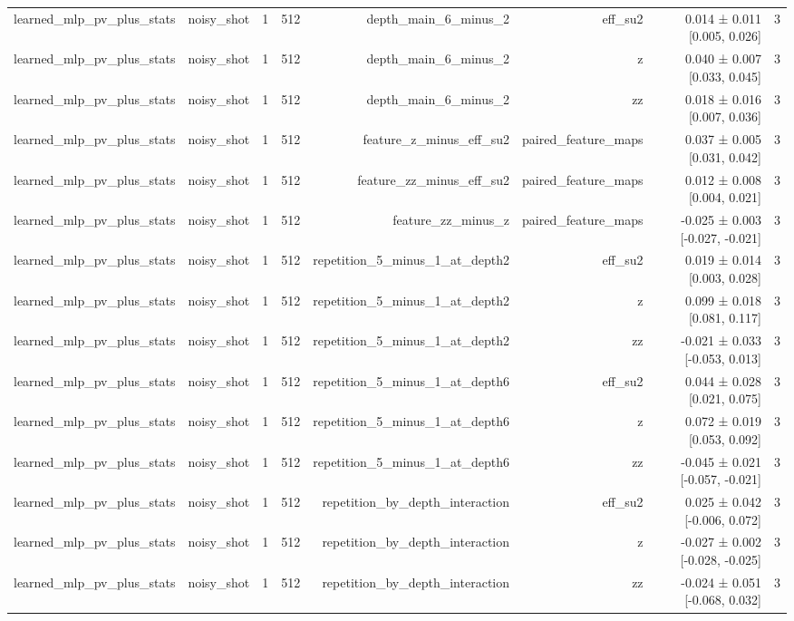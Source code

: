 \begin{table}
\begin{tabular}{lrrrrrrr}
learned\_mlp\_pv\_plus\_stats & noisy\_shot & 1 & 512 & depth\_main\_6\_minus\_2 & eff\_su2 & 0.014 ± 0.011 [0.005, 0.026] & 3 \\
learned\_mlp\_pv\_plus\_stats & noisy\_shot & 1 & 512 & depth\_main\_6\_minus\_2 & z & 0.040 ± 0.007 [0.033, 0.045] & 3 \\
learned\_mlp\_pv\_plus\_stats & noisy\_shot & 1 & 512 & depth\_main\_6\_minus\_2 & zz & 0.018 ± 0.016 [0.007, 0.036] & 3 \\
learned\_mlp\_pv\_plus\_stats & noisy\_shot & 1 & 512 & feature\_z\_minus\_eff\_su2 & paired\_feature\_maps & 0.037 ± 0.005 [0.031, 0.042] & 3 \\
learned\_mlp\_pv\_plus\_stats & noisy\_shot & 1 & 512 & feature\_zz\_minus\_eff\_su2 & paired\_feature\_maps & 0.012 ± 0.008 [0.004, 0.021] & 3 \\
learned\_mlp\_pv\_plus\_stats & noisy\_shot & 1 & 512 & feature\_zz\_minus\_z & paired\_feature\_maps & -0.025 ± 0.003 [-0.027, -0.021] & 3 \\
learned\_mlp\_pv\_plus\_stats & noisy\_shot & 1 & 512 & repetition\_5\_minus\_1\_at\_depth2 & eff\_su2 & 0.019 ± 0.014 [0.003, 0.028] & 3 \\
learned\_mlp\_pv\_plus\_stats & noisy\_shot & 1 & 512 & repetition\_5\_minus\_1\_at\_depth2 & z & 0.099 ± 0.018 [0.081, 0.117] & 3 \\
learned\_mlp\_pv\_plus\_stats & noisy\_shot & 1 & 512 & repetition\_5\_minus\_1\_at\_depth2 & zz & -0.021 ± 0.033 [-0.053, 0.013] & 3 \\
learned\_mlp\_pv\_plus\_stats & noisy\_shot & 1 & 512 & repetition\_5\_minus\_1\_at\_depth6 & eff\_su2 & 0.044 ± 0.028 [0.021, 0.075] & 3 \\
learned\_mlp\_pv\_plus\_stats & noisy\_shot & 1 & 512 & repetition\_5\_minus\_1\_at\_depth6 & z & 0.072 ± 0.019 [0.053, 0.092] & 3 \\
learned\_mlp\_pv\_plus\_stats & noisy\_shot & 1 & 512 & repetition\_5\_minus\_1\_at\_depth6 & zz & -0.045 ± 0.021 [-0.057, -0.021] & 3 \\
learned\_mlp\_pv\_plus\_stats & noisy\_shot & 1 & 512 & repetition\_by\_depth\_interaction & eff\_su2 & 0.025 ± 0.042 [-0.006, 0.072] & 3 \\
learned\_mlp\_pv\_plus\_stats & noisy\_shot & 1 & 512 & repetition\_by\_depth\_interaction & z & -0.027 ± 0.002 [-0.028, -0.025] & 3 \\
learned\_mlp\_pv\_plus\_stats & noisy\_shot & 1 & 512 & repetition\_by\_depth\_interaction & zz & -0.024 ± 0.051 [-0.068, 0.032] & 3 \\

\end{tabular}
\end{table}
